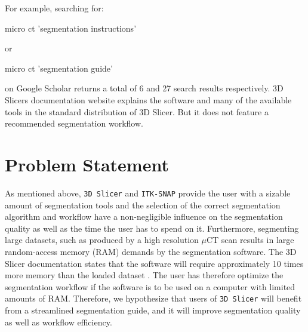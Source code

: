 \begin{body}
	For example, searching for:
	\begin{displayquote}
		micro ct 'segmentation instructions'
	\end{displayquote}
	or
	\begin{displayquote}
		micro ct 'segmentation guide'
	\end{displayquote}
	on Google Scholar returns a total of 6 and 27 search results respectively.
	3D Slicers documentation website\cite{pinterPolymorphSegmentationRepresentation2019} explains the software and many of the available tools in the standard distribution of 3D Slicer. But it does not feature a recommended segmentation workflow.
\end{body}
\clearpage
\section{Problem Statement}
\begin{body}
	As mentioned above, \texttt{3D Slicer} and \texttt{ITK-SNAP} provide the user with a sizable amount of segmentation tools and the selection of the correct segmentation algorithm and workflow have a non-negligible influence on the segmentation quality as well as the time the user has to spend on it. Furthermore, segmenting large datasets, such as produced by a high resolution $\mu$CT scan results in large random-access memory (RAM) demands by the segmentation software.
	The 3D Slicer documentation states that the software will require approximately 10 times more memory than the loaded dataset \cite{slicercommunity3DSlicerImage2022,fedorov3DSlicerImage2012}.
	The user has therefore optimize the segmentation workflow if the software is to be used on a computer with limited amounts of RAM.
	Therefore, we hypothesize that users of \texttt{3D Slicer} will benefit from a streamlined segmentation guide, and it will improve segmentation quality as well as workflow efficiency.
\end{body}
\clearpage
